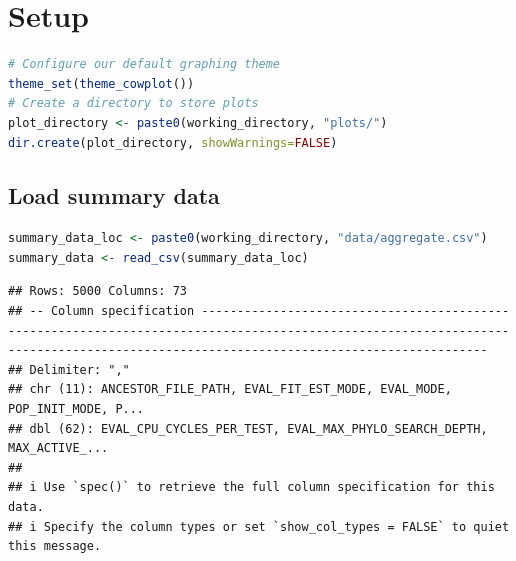 \documentclass[
]{book}
\begin{document}
\hypertarget{setup-3}{%
\section{Setup}\label{setup-3}}

\begin{lstlisting}[language=R]
# Configure our default graphing theme
theme_set(theme_cowplot())
# Create a directory to store plots
plot_directory <- paste0(working_directory, "plots/")
dir.create(plot_directory, showWarnings=FALSE)
\end{lstlisting}

\hypertarget{load-summary-data}{%
\subsection{Load summary data}\label{load-summary-data}}

\begin{lstlisting}[language=R]
summary_data_loc <- paste0(working_directory, "data/aggregate.csv")
summary_data <- read_csv(summary_data_loc)
\end{lstlisting}

\begin{lstlisting}
## Rows: 5000 Columns: 73
## -- Column specification ------------------------------------------------------------------------------------------------------------------------------------------------------------------------------------
## Delimiter: ","
## chr (11): ANCESTOR_FILE_PATH, EVAL_FIT_EST_MODE, EVAL_MODE, POP_INIT_MODE, P...
## dbl (62): EVAL_CPU_CYCLES_PER_TEST, EVAL_MAX_PHYLO_SEARCH_DEPTH, MAX_ACTIVE_...
## 
## i Use `spec()` to retrieve the full column specification for this data.
## i Specify the column types or set `show_col_types = FALSE` to quiet this message.
\end{lstlisting}
\end{document}
